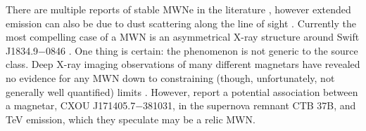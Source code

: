 There are multiple reports of stable MWNe in the literature \citep[e.g.][]{rmg+09,crb+13},
however extended emission can also be due to dust scattering along the line of sight \citep[e.g.][]{okn+11}.
Currently the most compelling case of a MWN is an asymmetrical X-ray structure around Swift J1834.9$-$0846 \citep{ykk+16}.
One thing is certain:  
the phenomenon is not generic to the source class.  
Deep X-ray imaging observations of many different
magnetars have revealed no evidence for any MWN down to constraining (though, unfortunately, not generally well quantified) 
limits \citep[e.g][]{ghbb04,akac13}.  
However, \citet{hg10} report a potential association between a magnetar, CXOU J171405.7$-$381031, in 
the supernova remnant CTB 37B, and 
TeV emission, which they speculate may be a relic MWN. 







